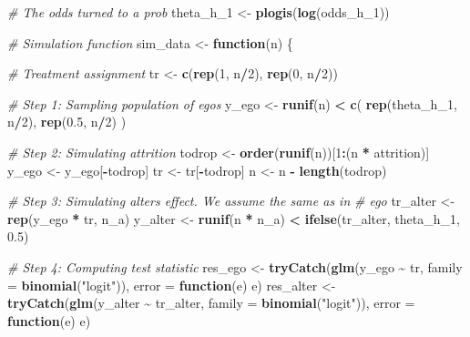\documentclass[
]{book}
\newenvironment{Shaded}{\begin{snugshade}}{\end{snugshade}}
\newcommand{\AttributeTok}[1]{\textcolor[rgb]{0.13,0.29,0.53}{#1}}
\newcommand{\CommentTok}[1]{\textcolor[rgb]{0.56,0.35,0.01}{\textit{#1}}}
\newcommand{\ControlFlowTok}[1]{\textcolor[rgb]{0.13,0.29,0.53}{\textbf{#1}}}
\newcommand{\DecValTok}[1]{\textcolor[rgb]{0.00,0.00,0.81}{#1}}
\newcommand{\FloatTok}[1]{\textcolor[rgb]{0.00,0.00,0.81}{#1}}
\newcommand{\FunctionTok}[1]{\textcolor[rgb]{0.13,0.29,0.53}{\textbf{#1}}}
\newcommand{\NormalTok}[1]{#1}
\newcommand{\OtherTok}[1]{\textcolor[rgb]{0.56,0.35,0.01}{#1}}
\newcommand{\SpecialCharTok}[1]{\textcolor[rgb]{0.81,0.36,0.00}{\textbf{#1}}}
\newcommand{\StringTok}[1]{\textcolor[rgb]{0.31,0.60,0.02}{#1}}
\begin{document}
\begin{Shaded}
\begin{Highlighting}[]
\CommentTok{\# The odds turned to a prob}
\NormalTok{theta\_h\_1 }\OtherTok{\textless{}{-}} \FunctionTok{plogis}\NormalTok{(}\FunctionTok{log}\NormalTok{(odds\_h\_1))}

\CommentTok{\# Simulation function}
\NormalTok{sim\_data }\OtherTok{\textless{}{-}} \ControlFlowTok{function}\NormalTok{(n) \{}

  \CommentTok{\# Treatment assignment}
\NormalTok{  tr  }\OtherTok{\textless{}{-}} \FunctionTok{c}\NormalTok{(}\FunctionTok{rep}\NormalTok{(}\DecValTok{1}\NormalTok{, n}\SpecialCharTok{/}\DecValTok{2}\NormalTok{), }\FunctionTok{rep}\NormalTok{(}\DecValTok{0}\NormalTok{, n}\SpecialCharTok{/}\DecValTok{2}\NormalTok{))}

  \CommentTok{\# Step 1: Sampling population of egos}
\NormalTok{  y\_ego }\OtherTok{\textless{}{-}} \FunctionTok{runif}\NormalTok{(n) }\SpecialCharTok{\textless{}} \FunctionTok{c}\NormalTok{(}
    \FunctionTok{rep}\NormalTok{(theta\_h\_1, n}\SpecialCharTok{/}\DecValTok{2}\NormalTok{),}
    \FunctionTok{rep}\NormalTok{(}\FloatTok{0.5}\NormalTok{, n}\SpecialCharTok{/}\DecValTok{2}\NormalTok{)}
\NormalTok{  )}

  \CommentTok{\# Step 2: Simulating attrition}
\NormalTok{  todrop }\OtherTok{\textless{}{-}} \FunctionTok{order}\NormalTok{(}\FunctionTok{runif}\NormalTok{(n))[}\DecValTok{1}\SpecialCharTok{:}\NormalTok{(n }\SpecialCharTok{*}\NormalTok{ attrition)]}
\NormalTok{  y\_ego  }\OtherTok{\textless{}{-}}\NormalTok{ y\_ego[}\SpecialCharTok{{-}}\NormalTok{todrop]}
\NormalTok{  tr     }\OtherTok{\textless{}{-}}\NormalTok{ tr[}\SpecialCharTok{{-}}\NormalTok{todrop]}
\NormalTok{  n      }\OtherTok{\textless{}{-}}\NormalTok{ n }\SpecialCharTok{{-}} \FunctionTok{length}\NormalTok{(todrop)}

  \CommentTok{\# Step 3: Simulating alter\textquotesingle{}s effect. We assume the same as in}
  \CommentTok{\# ego}
\NormalTok{  tr\_alter }\OtherTok{\textless{}{-}} \FunctionTok{rep}\NormalTok{(y\_ego }\SpecialCharTok{*}\NormalTok{ tr, n\_a)}
\NormalTok{  y\_alter  }\OtherTok{\textless{}{-}} \FunctionTok{runif}\NormalTok{(n }\SpecialCharTok{*}\NormalTok{ n\_a) }\SpecialCharTok{\textless{}} \FunctionTok{ifelse}\NormalTok{(tr\_alter, theta\_h\_1, }\FloatTok{0.5}\NormalTok{)}

  \CommentTok{\# Step 4: Computing test statistic}
\NormalTok{  res\_ego   }\OtherTok{\textless{}{-}} \FunctionTok{tryCatch}\NormalTok{(}\FunctionTok{glm}\NormalTok{(y\_ego }\SpecialCharTok{\textasciitilde{}}\NormalTok{ tr, }\AttributeTok{family =} \FunctionTok{binomial}\NormalTok{(}\StringTok{"logit"}\NormalTok{)), }\AttributeTok{error =} \ControlFlowTok{function}\NormalTok{(e) e)}
\NormalTok{  res\_alter }\OtherTok{\textless{}{-}} \FunctionTok{tryCatch}\NormalTok{(}\FunctionTok{glm}\NormalTok{(y\_alter }\SpecialCharTok{\textasciitilde{}}\NormalTok{ tr\_alter, }\AttributeTok{family =} \FunctionTok{binomial}\NormalTok{(}\StringTok{"logit"}\NormalTok{)), }\AttributeTok{error =} \ControlFlowTok{function}\NormalTok{(e) e)}


\end{Highlighting}
\end{Shaded}
\end{document}
